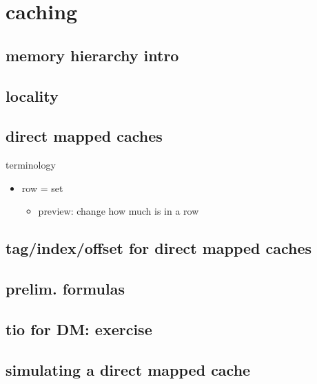 \section{caching}

\subsection{memory hierarchy intro}


\subsection{locality}


\subsection{direct mapped caches}


\begin{frame}{terminology}
    \begin{itemize}
    \item row = set
        \begin{itemize}
        \item preview: change how much is in a row
        \end{itemize}
    \end{itemize}
\end{frame}

\subsection{tag/index/offset for direct mapped caches}


\subsection{prelim. formulas}


\subsection{tio for DM: exercise}


\subsection{simulating a direct mapped cache}


